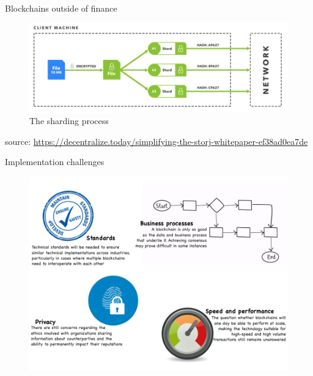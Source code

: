 \documentclass[11pt]{beamer}
\begin{document}

\begin{frame}{Blockchains outside of finance}
	\begin{figure}[]
		\centering
		\includegraphics  [scale=0.3]{Images/storj}
		\caption{The sharding process}
	\end{figure}
		\begin{scriptsize}
		source: \href{https://decentralize.today/simplifying-the-storj-whitepaper-ef38ad0ea7de}{https://decentralize.today/simplifying-the-storj-whitepaper-ef38ad0ea7de}
	\end{scriptsize}
\end{frame}


\begin{frame}{Implementation challenges}
	\begin{figure}[]
		\centering
		\includegraphics  [scale=0.3]{Images/implementation}
	\end{figure}
\end{frame}
\end{document}

